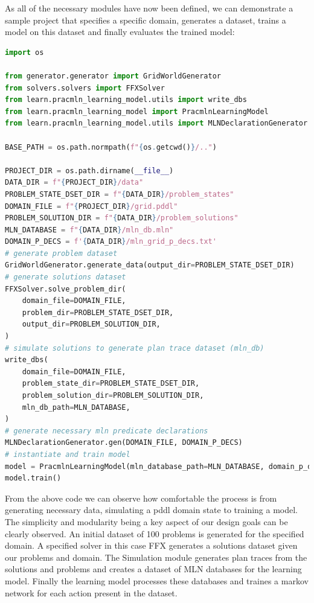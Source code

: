 As all of the necessary modules have now been defined, we can demonstrate a sample project that specifies a specific domain, generates a dataset, trains a model on this dataset and finally evaluates the trained model:

\begin{lstlisting}[language=Python]
import os

from generator.generator import GridWorldGenerator
from solvers.solvers import FFXSolver
from learn.pracmln_learning_model.utils import write_dbs
from learn.pracmln_learning_model import PracmlnLearningModel
from learn.pracmln_learning_model.utils import MLNDeclarationGenerator

BASE_PATH = os.path.normpath(f"{os.getcwd()}/..")

PROJECT_DIR = os.path.dirname(__file__)
DATA_DIR = f"{PROJECT_DIR}/data"
PROBLEM_STATE_DSET_DIR = f"{DATA_DIR}/problem_states"
DOMAIN_FILE = f"{PROJECT_DIR}/grid.pddl"
PROBLEM_SOLUTION_DIR = f"{DATA_DIR}/problem_solutions"
MLN_DATABASE = f"{DATA_DIR}/mln_db.mln"
DOMAIN_P_DECS = f'{DATA_DIR}/mln_grid_p_decs.txt'
# generate problem dataset
GridWorldGenerator.generate_data(output_dir=PROBLEM_STATE_DSET_DIR)
# generate solutions dataset
FFXSolver.solve_problem_dir(
    domain_file=DOMAIN_FILE,
    problem_dir=PROBLEM_STATE_DSET_DIR,
    output_dir=PROBLEM_SOLUTION_DIR,
)
# simulate solutions to generate plan trace dataset (mln_db)
write_dbs(
    domain_file=DOMAIN_FILE,
    problem_state_dir=PROBLEM_STATE_DSET_DIR,
    problem_solution_dir=PROBLEM_SOLUTION_DIR,
    mln_db_path=MLN_DATABASE,
)
# generate necessary mln predicate declarations
MLNDeclarationGenerator.gen(DOMAIN_FILE, DOMAIN_P_DECS)
# instantiate and train model
model = PracmlnLearningModel(mln_database_path=MLN_DATABASE, domain_p_decs_path=DOMAIN_P_DECS)
model.train()
\end{lstlisting}\label{example-project}

From the above code we can observe how comfortable the process is from generating necessary data, simulating a pddl domain state to training a model.
The simplicity and modularity being a key aspect of our design goals can be clearly observed.
An initial dataset of 100 problems is generated for the specified domain.
A specified solver in this case FFX generates a solutions dataset given our problems and domain.
The Simulation module generates plan traces from the solutions and problems and creates a dataset of MLN databases for the learning model.
Finally the learning model processes these databases and traines a markov network for each action present in the dataset.








